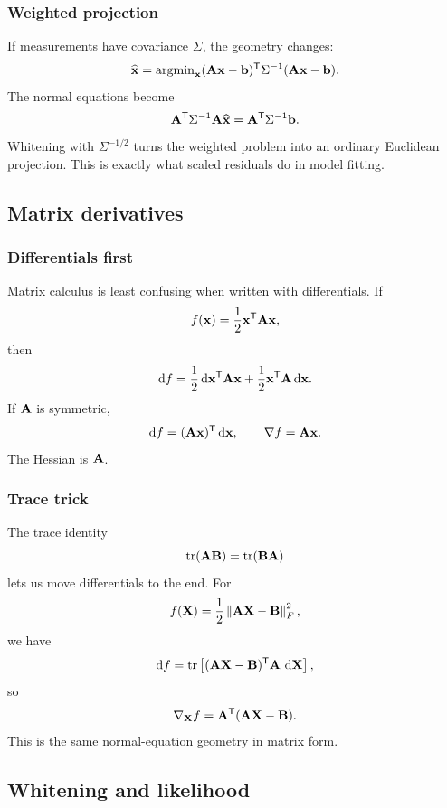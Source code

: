\subsubsection*{Weighted projection}

If measurements have covariance \(\Sigma\), the geometry changes:
\[
  \widehat{\mathbf{x}}
  =
  \operatorname{argmin}_{\mathbf{x}}
  (\mathbf{A}\mathbf{x}-\mathbf{b})^{\mathsf{T}}
  \Sigma^{-1}
  (\mathbf{A}\mathbf{x}-\mathbf{b}).
\]
The normal equations become
\[
  \mathbf{A}^{\mathsf{T}}\Sigma^{-1}\mathbf{A}\widehat{\mathbf{x}}
  =
  \mathbf{A}^{\mathsf{T}}\Sigma^{-1}\mathbf{b}.
\]
Whitening with \(\Sigma^{-1/2}\) turns the weighted problem into an ordinary Euclidean projection.  This is exactly what scaled residuals do in model fitting.

\subsection{Matrix derivatives}

\subsubsection*{Differentials first}

Matrix calculus is least confusing when written with differentials.  If
\[
  f(\mathbf{x})=\frac{1}{2}\mathbf{x}^{\mathsf{T}}\mathbf{A}\mathbf{x},
\]
then
\[
  \mathop{}\!\mathrm{d} f
  =
  \frac{1}{2}\mathop{}\!\mathrm{d}\mathbf{x}^{\mathsf{T}}\mathbf{A}\mathbf{x}
  +
  \frac{1}{2}\mathbf{x}^{\mathsf{T}}\mathbf{A}\mathop{}\!\mathrm{d}\mathbf{x}.
\]
If \(\mathbf{A}\) is symmetric,
\[
  \mathop{}\!\mathrm{d} f=(\mathbf{A}\mathbf{x})^{\mathsf{T}}\mathop{}\!\mathrm{d}\mathbf{x},
  \qquad
  \nabla f=\mathbf{A}\mathbf{x}.
\]
The Hessian is \(\mathbf{A}\).

\subsubsection*{Trace trick}

The trace identity
\[
  \operatorname{tr}(\mathbf{A}\mathbf{B})=\operatorname{tr}(\mathbf{B}\mathbf{A})
\]
lets us move differentials to the end.  For
\[
  f(\mathbf{X})=\frac{1}{2}\left\lVert \mathbf{A}\mathbf{X}-\mathbf{B}\right\rVert_F^2,
\]
we have
\[
  \mathop{}\!\mathrm{d} f
  =
  \operatorname{tr}\left[
    (\mathbf{A}\mathbf{X}-\mathbf{B})^{\mathsf{T}}\mathbf{A}\,\mathop{}\!\mathrm{d}\mathbf{X}
  \right],
\]
so
\[
  \nabla_{\mathbf{X}} f
  =
  \mathbf{A}^{\mathsf{T}}(\mathbf{A}\mathbf{X}-\mathbf{B}).
\]
This is the same normal-equation geometry in matrix form.

\subsection{Whitening and likelihood}


